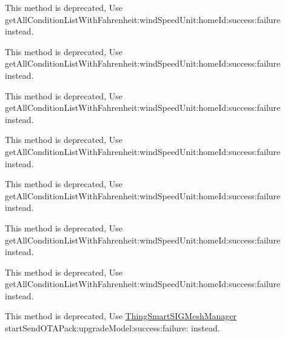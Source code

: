 \begin{DoxyRefList}
\label{deprecated__deprecated000082}%
%
This method is deprecated, Use get\+All\+Condition\+List\+With\+Fahrenheit\+:wind\+Speed\+Unit\+:home\+Id\+:success\+:failure instead. 

\label{deprecated__deprecated000074}%
%
This method is deprecated, Use get\+All\+Condition\+List\+With\+Fahrenheit\+:wind\+Speed\+Unit\+:home\+Id\+:success\+:failure instead. 

\label{deprecated__deprecated000078}%
%
This method is deprecated, Use get\+All\+Condition\+List\+With\+Fahrenheit\+:wind\+Speed\+Unit\+:home\+Id\+:success\+:failure instead.  
\item[Member \mbox{\hyperlink{interface_thing_smart_scene_manager_a99b09aeeaf7bf0a62a126fee2af9df89}{\mbox{[}Thing\+Smart\+Scene\+Manager get\+Condition\+List\+With\+Fahrenheit\+:success\+:failure\+:\mbox{]}}} ]\label{deprecated__deprecated000081}%
%
This method is deprecated, Use get\+All\+Condition\+List\+With\+Fahrenheit\+:wind\+Speed\+Unit\+:home\+Id\+:success\+:failure instead. 

\label{deprecated__deprecated000085}%
%
This method is deprecated, Use get\+All\+Condition\+List\+With\+Fahrenheit\+:wind\+Speed\+Unit\+:home\+Id\+:success\+:failure instead. 

\label{deprecated__deprecated000073}%
%
This method is deprecated, Use get\+All\+Condition\+List\+With\+Fahrenheit\+:wind\+Speed\+Unit\+:home\+Id\+:success\+:failure instead. 

\label{deprecated__deprecated000077}%
%
This method is deprecated, Use get\+All\+Condition\+List\+With\+Fahrenheit\+:wind\+Speed\+Unit\+:home\+Id\+:success\+:failure instead.  
\item[(OTA) Member \mbox{\hyperlink{category_thing_smart_s_i_g_mesh_manager_07_o_t_a_08_a97972e6686c2472e77d7889367aebfdc}{\mbox{[}Thing\+Smart\+SIGMesh\+Manager(OTA) start\+Send\+OTAPack\+:target\+Version\+:success\+:failure\+:\mbox{]}}} ]\label{deprecated__deprecated000091}%
%
This method is deprecated, Use \mbox{\hyperlink{interface_thing_smart_s_i_g_mesh_manager}{Thing\+Smart\+SIGMesh\+Manager}} start\+Send\+OTAPack\+:upgrade\+Model\+:success\+:failure\+: instead. 


\end{DoxyRefList}
